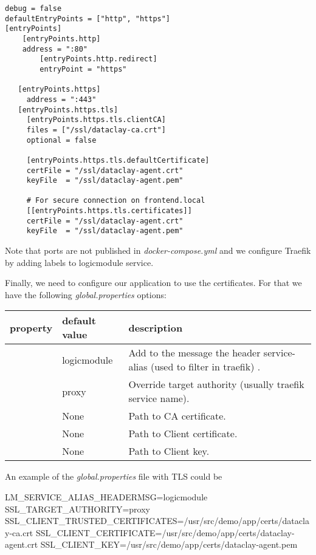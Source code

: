 \begin{tBox}
 \begin{lstlisting}[language=docker-compose-2, frame=none]
debug = false
defaultEntryPoints = ["http", "https"]
[entryPoints]
    [entryPoints.http]
    address = ":80"
        [entryPoints.http.redirect]
        entryPoint = "https"

   [entryPoints.https]
     address = ":443"
   [entryPoints.https.tls]
     [entryPoints.https.tls.clientCA]
     files = ["/ssl/dataclay-ca.crt"]
     optional = false

	 [entryPoints.https.tls.defaultCertificate]
     certFile = "/ssl/dataclay-agent.crt"
     keyFile  = "/ssl/dataclay-agent.pem"
     
     # For secure connection on frontend.local
     [[entryPoints.https.tls.certificates]]
     certFile = "/ssl/dataclay-agent.crt"
     keyFile  = "/ssl/dataclay-agent.pem"
 \end{lstlisting}
\end{tBox}

Note that ports are not published in \textit{docker-compose.yml} and we configure Traefik by adding labels to logicmodule service.

Finally, we need to configure our application to use the certificates. For that we have the following \textit{global.properties} options:

\begin{table}[H]
\footnotesize
\begin{tBox}
\centering
\begin{tabular}{p{57mm} | p{27mm} |  >{\raggedright\arraybackslash}p{50mm}}
\textbf{property} & \textbf{default value} & \textbf{description} \\
\hline
\verb LM_SERVICE_ALIAS_HEADERMSG & logicmodule & Add to the message the header service-alias (used to filter in traefik) . \\
\hline
\verb SSL_TARGET_AUTHORITY & proxy  & Override target authority (usually traefik service name). \\
\hline
\verb SSL_CLIENT_TRUSTED_CERTIFICATES & None & Path to CA certificate. \\
\hline
\verb SSL_CLIENT_CERTIFICATE & None & Path to Client certificate. \\
\hline
\verb SSL_CLIENT_KEY & None & Path to Client key. \\
\end{tabular}
\label{table:Security}
\end{tBox}
\end{table}

An example of the \textit{global.properties} file with TLS could be

\begin{tBox}
 \begin{bash}
LM_SERVICE_ALIAS_HEADERMSG=logicmodule
SSL_TARGET_AUTHORITY=proxy 
SSL_CLIENT_TRUSTED_CERTIFICATES=/usr/src/demo/app/certs/dataclay-ca.crt
SSL_CLIENT_CERTIFICATE=/usr/src/demo/app/certs/dataclay-agent.crt
SSL_CLIENT_KEY=/usr/src/demo/app/certs/dataclay-agent.pem
 \end{bash}
\end{tBox}